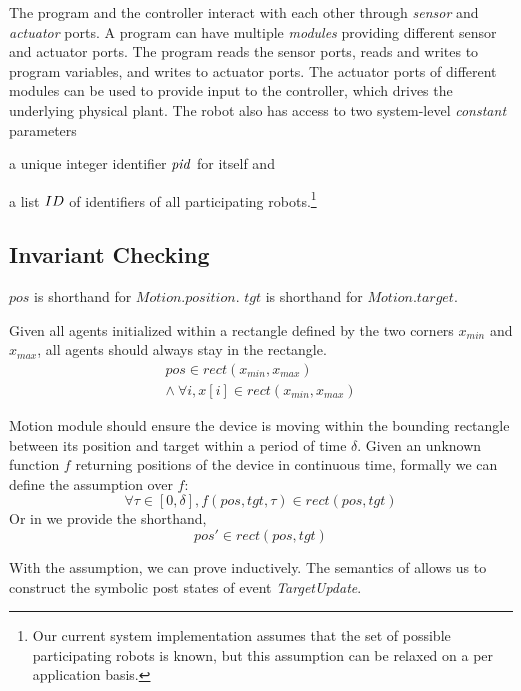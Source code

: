 The program and the controller interact with each other through \emph{sensor} and \emph{actuator} ports.
A \lgname program can have multiple \emph{modules} providing different sensor and actuator ports.
The program reads the sensor ports, reads and writes to program variables, and writes to actuator ports.
The actuator ports of different modules can be used to provide input to the controller, which drives the underlying physical plant.
%
The robot also has access to two system-level \emph{constant} parameters
\begin{inparaenum}[(a)]
\item a unique integer identifier $\mathit{pid}$ for itself and
\item a list $ID$ of identifiers of all participating robots.\footnote{Our current system implementation assumes that the set of possible participating robots is known, but this assumption can be relaxed on a per application basis.}
\end{inparaenum}

\subsection{Invariant Checking}

$pos$ is shorthand for $Motion.position$. $tgt$ is shorthand for $Motion.target$.

\begin{invariant}\label{inv:lineform}
Given all agents initialized within a rectangle defined by the two corners $x_{min}$ and $x_{max}$,
all agents should always stay in the rectangle.
\[
\begin{split}
    pos \in rect(x_{min}, x_{max})        \\
    \land\ \forall i, x[i] \in rect(x_{min}, x_{max})
\end{split}
\]
\end{invariant}


\begin{assumption}\label{lineform-assume}
Motion module should ensure the device is moving within the bounding rectangle between its position and target
within a period of time $\delta$.
Given an unknown function $f$ returning positions of the device in continuous time,
formally we can define the assumption over $f$:
\[
\forall \tau \in [0, \delta], f(pos, tgt, \tau) \in rect(pos, tgt)
\]
Or in \lgname we provide the shorthand,
\[
pos' \in rect(pos, tgt)
\]
\end{assumption}

With the assumption, we can prove  inductively.
The \K semantics of \lgname allows us to construct the symbolic post states of event \emph{TargetUpdate}.


